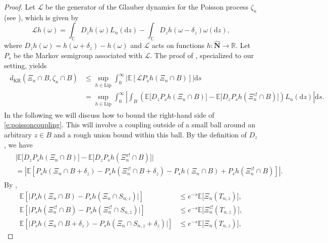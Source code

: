 \documentclass{amsart}
\theoremstyle{plain}
\theoremstyle{definition}
\theoremstyle{remark}
\def\E{\mathbb E}
\def\R{\mathbb R}
\def\d{\mathrm d}
\begin{document}
\begin{proof}
Let $\mathcal L$ be the generator of the Glauber dynamics for the Poisson process $\zeta_\kappa$ (see \cite[(2.7)]{BSY21}), which is given by
\[
\mathcal L h(\omega) = \int_{\mathbb C} D_z h(\omega) L_n( \d z) - \int_{\mathbb C} D_z h(\omega - \delta_z ) \omega( \d z),
\]
where $D_z h(\omega) = h(\omega + \delta_z) - h(\omega)$ and $\mathcal L$ acts on functions  $h\colon \widehat{\mathbf{N}} \rightarrow \R$. Let $P_s$ be the Markov semigroup associated with $\mathcal L$.
The proof of \cite[Theorem 3.1]{BSY21}, specialized to our setting, yields
\begin{align}
\begin{split}
{d_{\mathrm{KR}}}(\Xi_n\cap B, \zeta_\kappa \cap B) &\le  \sup_{h \in \text{Lip}}  \int_0^\infty \big |\E[ \mathcal L P_s h(\Xi_n \cap B)] \big| \d s\\ 
	&= \sup_{h \in \text{Lip}}   \int_0^\infty \left| \int_B \left( \E \big[ D_z P_s h(\Xi_n \cap B )\big] - \E \big[D_z P_s h(\Xi_n^{z!} \cap B)\big] \right)  L_n(\d z)   \right| \d s.
\label{e:poissoncoupling}
\end{split}
\end{align}
In the following we will discuss how to bound the right-hand side of \eqref{e:poissoncoupling}. This will involve a coupling outside of a small ball around an arbitrary $z\in B$ and a rough union bound within this ball. 
By the definition of $D_z$, we have 
\begin{align}
\begin{split}
& \Big| \E \big[ D_z P_s h(\Xi_n \cap B )\big] - \E \big[D_z P_s h(\Xi_n^{x!} \cap B)\big] \Big| \\ 
 &= 
\left| \E\left[  P_s h( \Xi_n \cap B  + \delta_z )  -  P_s h( \Xi_n^{z!}  \cap B  + \delta_z ) 
 - 
  P_s h( \Xi_n \cap B  )  +  P_s h( \Xi_n^{z!}  \cap B  )  \right]\right|.
\label{e:split1}
\end{split}
\end{align}
By \cite[(2.9)]{BSY21},
\begin{align*}
\E\left[  \big| P_s h( \Xi_n \cap B  )  -  P_s h( \Xi_n \cap  S_{n,z}  )  \big|  \right] &\le e^{-s} \E \big[\Xi_n ( T_{n,z})\big],
\\
\E\left[  \big| P_s h( \Xi^{z!}_n \cap B  )  -  P_s h( \Xi^{z!}_n \cap S_{n,z}  )  \big|  \right] &\le e^{-s} \E \big[\Xi^{z!}_n ( T_{n,z} )\big],  \\
\E\left[  \big| P_s h( \Xi_n \cap B  + \delta_z )  -  P_s h( \Xi_n \cap S_{n,z}  + \delta_z)  \big|  \right] &\le e^{-s} \E \big[\Xi_n ( T_{n,z})\big],

\end{align*}
\end{proof}
\end{document}

